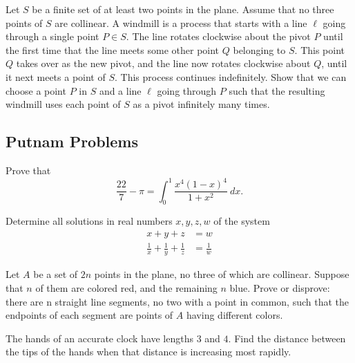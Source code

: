 \documentclass[12pt]{article}
\begin{document}
    \begin{exercise}
        Let $S$ be a finite set of at least two points in the plane. Assume that no three points of $S$ are collinear. A windmill is a process that starts with a line $\ell$ going through a single point $P \in S$. The line rotates clockwise about the pivot $P$ until the first time that the line meets some other point $Q$ belonging to $S$. This point $Q$ takes over as the new pivot, and the line now rotates clockwise about $Q$, until it next meets a point of $S$. This process continues indefinitely. Show that we can choose a point $P$ in $S$ and a line $\ell$ going through $P$ such that the resulting windmill uses each point of $S$ as a pivot infinitely many times.
    \end{exercise}

    \subsection{Putnam Problems}

    \begin{exercise}[1968 A1]
        Prove that
        \[\frac{22}{7}-\pi = \int_0^1\frac{x^4(1-x)^4}{1+x^2}\ dx.\]
    \end{exercise}

    \begin{exercise}[1977 A2]
        Determine all solutions in real numbers $x,y,z,w$ of the system
        \begin{align*}
            x+y+z&= w \\
            \frac{1}{x}+\frac{
            1}{y}+\frac{1}{z} &= \frac{1}{w}
        \end{align*}
    \end{exercise}

    \begin{exercise}[1979 A4]
        Let $A$ be a set of $2n$ points in the plane, no three of which are collinear. Suppose that $n$ of them are colored red, and the remaining $n$ blue. Prove or disprove: there are n straight line segments, no two with a point in common, such that the endpoints of each segment are points of $A$ having different colors. 
    \end{exercise}

    \begin{exercise}[1983 A2]
        The hands of an accurate clock have lengths $3$ and $4$. Find the distance between the tips of the hands when that distance is increasing most rapidly.
    \end{exercise}
\end{document}
